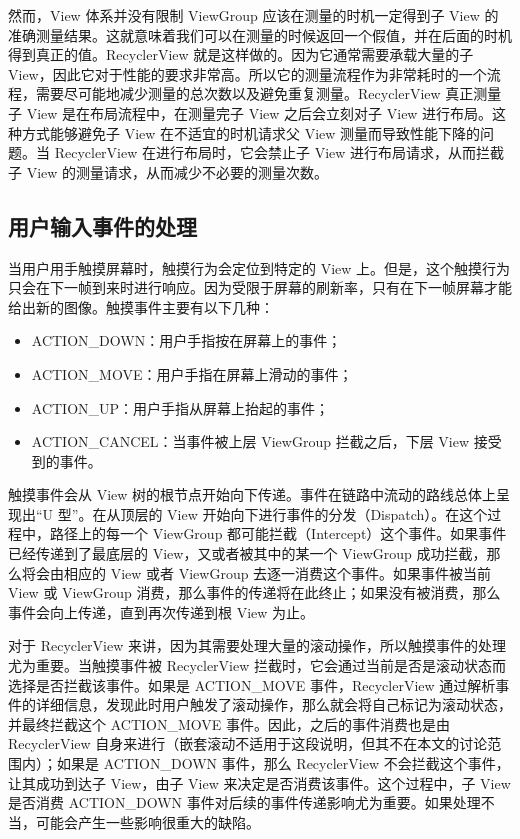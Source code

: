 然而，View 体系并没有限制 ViewGroup 应该在测量的时机一定得到子 View 的准确测量结果。这就意味着我们可以在测量的时候返回一个假值，并在后面的时机得到真正的值。RecyclerView 就是这样做的。因为它通常需要承载大量的子 View，因此它对于性能的要求非常高。所以它的测量流程作为非常耗时的一个流程，需要尽可能地减少测量的总次数以及避免重复测量。RecyclerView 真正测量子 View 是在布局流程中，在测量完子 View 之后会立刻对子 View 进行布局。这种方式能够避免子 View 在不适宜的时机请求父 View 测量而导致性能下降的问题。当 RecyclerView 在进行布局时，它会禁止子 View 进行布局请求，从而拦截子 View 的测量请求，从而减少不必要的测量次数。


\subsection{用户输入事件的处理}

当用户用手触摸屏幕时，触摸行为会定位到特定的 View 上。但是，这个触摸行为只会在下一帧到来时进行响应。因为受限于屏幕的刷新率，只有在下一帧屏幕才能给出新的图像。触摸事件主要有以下几种：


\begin{itemize}
    \item ACTION\_DOWN：用户手指按在屏幕上的事件；
    \item ACTION\_MOVE：用户手指在屏幕上滑动的事件；
    \item ACTION\_UP：用户手指从屏幕上抬起的事件；
    \item ACTION\_CANCEL：当事件被上层 ViewGroup 拦截之后，下层 View 接受到的事件。
\end{itemize}

触摸事件会从 View 树的根节点开始向下传递。事件在链路中流动的路线总体上呈现出“U 型”。在从顶层的 View 开始向下进行事件的分发（Dispatch）。在这个过程中，路径上的每一个 ViewGroup 都可能拦截（Intercept）这个事件\cite{wu2017appcheck}。如果事件已经传递到了最底层的 View，又或者被其中的某一个 ViewGroup 成功拦截，那么将会由相应的 View 或者 ViewGroup 去逐一消费这个事件。如果事件被当前 View 或 ViewGroup 消费，那么事件的传递将在此终止；如果没有被消费，那么事件会向上传递，直到再次传递到根 View 为止。

对于 RecyclerView 来讲，因为其需要处理大量的滚动操作，所以触摸事件的处理尤为重要。当触摸事件被 RecyclerView 拦截时，它会通过当前是否是滚动状态而选择是否拦截该事件。如果是 ACTION\_MOVE 事件，RecyclerView 通过解析事件的详细信息，发现此时用户触发了滚动操作，那么就会将自己标记为滚动状态，并最终拦截这个 ACTION\_MOVE 事件。因此，之后的事件消费也是由 RecyclerView 自身来进行（嵌套滚动不适用于这段说明，但其不在本文的讨论范围内）；如果是 ACTION\_DOWN 事件，那么 RecyclerView 不会拦截这个事件，让其成功到达子 View，由子 View 来决定是否消费该事件。这个过程中，子 View 是否消费 ACTION\_DOWN 事件对后续的事件传递影响尤为重要。如果处理不当，可能会产生一些影响很重大的缺陷。

